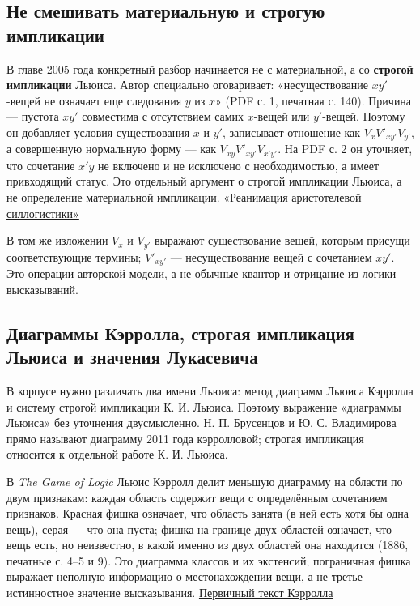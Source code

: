 \documentclass[12pt,a4paper]{article}
\begin{document}
\subsection{Не смешивать материальную и строгую импликации}

В главе 2005 года конкретный разбор начинается не с материальной, а со \textbf{строгой импликации} Льюиса. Автор специально оговаривает: «несуществование \(xy'\)-вещей не означает еще следования \(y\) из \(x\)» (PDF с. 1, печатная с. 140). Причина — пустота \(xy'\) совместима с отсутствием самих \(x\)-вещей или \(y'\)-вещей. Поэтому он добавляет условия существования \(x\) и \(y'\), записывает отношение как \(V_xV'_{xy'}V_{y'}\), а совершенную нормальную форму — как \(V_{xy}V'_{xy'}V_{x'y'}\). На PDF с. 2 он уточняет, что сочетание \(x'y\) не включено и не исключено с необходимостью, а имеет привходящий статус. Это отдельный аргумент о строгой импликации Льюиса, а не определение материальной импликации. \href{https://ternarycomp.cs.msu.ru/Papers/Rea.pdf}{«Реанимация аристотелевой силлогистики»}

В том же изложении \(V_x\) и \(V_{y'}\) выражают существование вещей, которым присущи соответствующие термины; \(V'_{xy'}\) — несуществование вещей с сочетанием \(xy'\). Это операции авторской модели, а не обычные квантор и отрицание из логики высказываний.

\subsection{Диаграммы Кэрролла, строгая импликация Льюиса и значения Лукасевича}

В корпусе нужно различать два имени Льюиса: метод диаграмм Льюиса Кэрролла и систему строгой импликации К. И. Льюиса. Поэтому выражение «диаграммы Льюиса» без уточнения двусмысленно. Н. П. Брусенцов и Ю. С. Владимирова прямо называют диаграмму 2011 года кэрролловой; строгая импликация относится к отдельной работе К. И. Льюиса.

В \emph{The Game of Logic} Льюис Кэрролл делит меньшую диаграмму на области по двум признакам: каждая область содержит вещи с определённым сочетанием признаков. Красная фишка означает, что область занята (в ней есть хотя бы одна вещь), серая — что она пуста; фишка на границе двух областей означает, что вещь есть, но неизвестно, в какой именно из двух областей она находится (1886, печатные с. 4–5 и 9). Это диаграмма классов и их экстенсий; пограничная фишка выражает неполную информацию о местонахождении вещи, а не третье истинностное значение высказывания. \href{https://archive.org/details/gameoflogic00carrrich}{Первичный текст Кэрролла}
\end{document}
